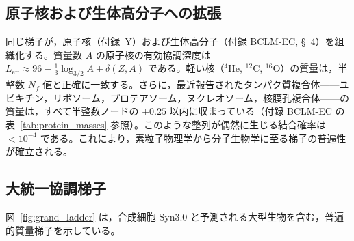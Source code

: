 \documentclass[11pt,a4paper]{article}
\begin{document}
	\subsection{原子核および生体高分子への拡張}
	
	同じ梯子が，原子核（付録~Y）および生体高分子（付録 BCLM-EC, §~4）を組織化する。質量数 \(A\) の原子核の有効協調深度は \(L_{\mathrm{eff}} \approx 96 - \frac13 \log_{3/2} A + \delta(Z,A)\) である。軽い核（\(^4\)He, \(^{12}\)C, \(^{16}\)O）の質量は，半整数 \(N_f\) 値と正確に一致する。さらに，最近報告されたタンパク質複合体——ユビキチン，リボソーム，プロテアソーム，ヌクレオソーム，核膜孔複合体——の質量は，すべて半整数ノードの \(\pm 0.25\) 以内に収まっている（付録 BCLM-EC の表~\ref{tab:protein_masses} 参照）。このような整列が偶然に生じる結合確率は \(< 10^{-4}\) である。これにより，素粒子物理学から分子生物学に至る梯子の普遍性が確立される。
	
	\subsection{大統一協調梯子}
	
	図~\ref{fig:grand_ladder} は，合成細胞 Syn3.0 と予測される大型生物を含む，普遍的質量梯子を示している。
	
\end{document}
